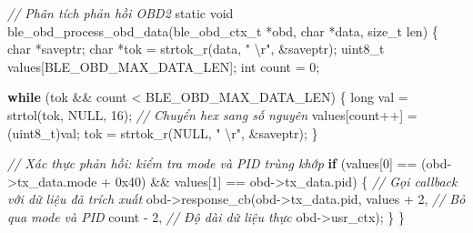 \documentclass[13pt,a4paper]{extarticle}
\newenvironment{Shaded}{}{}
\newcommand{\BaseNTok}[1]{\textcolor[rgb]{0.25,0.63,0.44}{#1}}
\newcommand{\CommentTok}[1]{\textcolor[rgb]{0.38,0.63,0.69}{\textit{#1}}}
\newcommand{\ControlFlowTok}[1]{\textcolor[rgb]{0.00,0.44,0.13}{\textbf{#1}}}
\newcommand{\DataTypeTok}[1]{\textcolor[rgb]{0.56,0.13,0.00}{#1}}
\newcommand{\DecValTok}[1]{\textcolor[rgb]{0.25,0.63,0.44}{#1}}
\newcommand{\NormalTok}[1]{#1}
\newcommand{\OperatorTok}[1]{\textcolor[rgb]{0.40,0.40,0.40}{#1}}
\newcommand{\SpecialCharTok}[1]{\textcolor[rgb]{0.25,0.44,0.63}{#1}}
\newcommand{\StringTok}[1]{\textcolor[rgb]{0.25,0.44,0.63}{#1}}
\renewcommand{\\}{\thesislongtableorignewline\hline}%
\begin{document}
\begin{Shaded}
\begin{Highlighting}[]
\CommentTok{// Phân tích phản hồi OBD2}
\DataTypeTok{static} \DataTypeTok{void}\NormalTok{ ble\_obd\_process\_obd\_data}\OperatorTok{(}\NormalTok{ble\_obd\_ctx\_t }\OperatorTok{*}\NormalTok{obd}\OperatorTok{,}
                                      \DataTypeTok{char} \OperatorTok{*}\NormalTok{data}\OperatorTok{,} \DataTypeTok{size\_t}\NormalTok{ len}\OperatorTok{)}
\OperatorTok{\{}
    \DataTypeTok{char} \OperatorTok{*}\NormalTok{saveptr}\OperatorTok{;}
    \DataTypeTok{char} \OperatorTok{*}\NormalTok{tok }\OperatorTok{=}\NormalTok{ strtok\_r}\OperatorTok{(}\NormalTok{data}\OperatorTok{,} \StringTok{" }\SpecialCharTok{\textbackslash{}r}\StringTok{"}\OperatorTok{,} \OperatorTok{\&}\NormalTok{saveptr}\OperatorTok{);}
    \DataTypeTok{uint8\_t}\NormalTok{ values}\OperatorTok{[}\NormalTok{BLE\_OBD\_MAX\_DATA\_LEN}\OperatorTok{];}
    \DataTypeTok{int}\NormalTok{ count }\OperatorTok{=} \DecValTok{0}\OperatorTok{;}

    \ControlFlowTok{while} \OperatorTok{(}\NormalTok{tok }\OperatorTok{\&\&}\NormalTok{ count }\OperatorTok{\textless{}}\NormalTok{ BLE\_OBD\_MAX\_DATA\_LEN}\OperatorTok{)} \OperatorTok{\{}
        \DataTypeTok{long}\NormalTok{ val }\OperatorTok{=}\NormalTok{ strtol}\OperatorTok{(}\NormalTok{tok}\OperatorTok{,}\NormalTok{ NULL}\OperatorTok{,} \DecValTok{16}\OperatorTok{);}  \CommentTok{// Chuyển hex sang số nguyên}
\NormalTok{        values}\OperatorTok{[}\NormalTok{count}\OperatorTok{++]} \OperatorTok{=} \OperatorTok{(}\DataTypeTok{uint8\_t}\OperatorTok{)}\NormalTok{val}\OperatorTok{;}
\NormalTok{        tok }\OperatorTok{=}\NormalTok{ strtok\_r}\OperatorTok{(}\NormalTok{NULL}\OperatorTok{,} \StringTok{" }\SpecialCharTok{\textbackslash{}r}\StringTok{"}\OperatorTok{,} \OperatorTok{\&}\NormalTok{saveptr}\OperatorTok{);}
    \OperatorTok{\}}

    \CommentTok{// Xác thực phản hồi: kiểm tra mode và PID trùng khớp}
    \ControlFlowTok{if} \OperatorTok{(}\NormalTok{values}\OperatorTok{[}\DecValTok{0}\OperatorTok{]} \OperatorTok{==} \OperatorTok{(}\NormalTok{obd}\OperatorTok{{-}\textgreater{}}\NormalTok{tx\_data}\OperatorTok{.}\NormalTok{mode }\OperatorTok{+} \BaseNTok{0x40}\OperatorTok{)} \OperatorTok{\&\&}
\NormalTok{        values}\OperatorTok{[}\DecValTok{1}\OperatorTok{]} \OperatorTok{==}\NormalTok{ obd}\OperatorTok{{-}\textgreater{}}\NormalTok{tx\_data}\OperatorTok{.}\NormalTok{pid}\OperatorTok{)} \OperatorTok{\{}
        \CommentTok{// Gọi callback với dữ liệu đã trích xuất}
\NormalTok{        obd}\OperatorTok{{-}\textgreater{}}\NormalTok{response\_cb}\OperatorTok{(}\NormalTok{obd}\OperatorTok{{-}\textgreater{}}\NormalTok{tx\_data}\OperatorTok{.}\NormalTok{pid}\OperatorTok{,}
\NormalTok{                         values }\OperatorTok{+} \DecValTok{2}\OperatorTok{,}      \CommentTok{// Bỏ qua mode và PID}
\NormalTok{                         count }\OperatorTok{{-}} \DecValTok{2}\OperatorTok{,}       \CommentTok{// Độ dài dữ liệu thực}
\NormalTok{                         obd}\OperatorTok{{-}\textgreater{}}\NormalTok{usr\_ctx}\OperatorTok{);}
    \OperatorTok{\}}
\OperatorTok{\}}
\end{Highlighting}
\end{Shaded}
\end{document}
